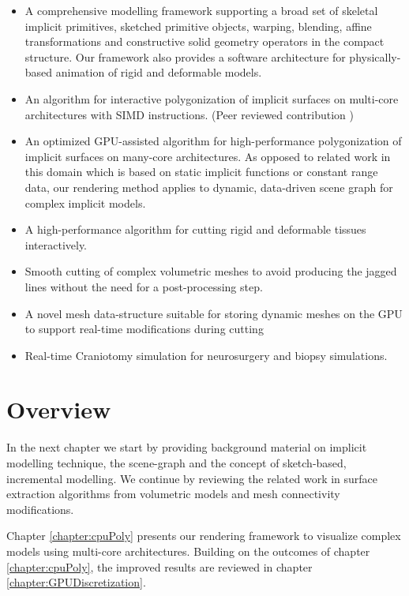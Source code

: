 \begin{itemize}
 \item A comprehensive modelling framework supporting a broad set of skeletal implicit primitives, 
 sketched primitive objects, warping, blending, affine transformations and constructive solid geometry 
 operators in the compact \blob structure. Our framework also provides a software architecture for 
 physically-based animation of rigid and deformable models.
 
 \item An algorithm for interactive polygonization of implicit surfaces on multi-core architectures with 
 SIMD instructions. (Peer reviewed contribution \cite{Shirazian2012}) 
 
 \item An optimized GPU-assisted algorithm for high-performance polygonization of implicit surfaces 
 on many-core architectures. As opposed to related work in this domain which is based on static implicit
 functions or constant range data, our rendering method applies to dynamic, data-driven \blob scene graph
 for complex implicit models. 
  
 \item A high-performance algorithm for cutting rigid and deformable tissues interactively. 
 
 \item Smooth cutting of complex volumetric meshes to avoid producing the jagged lines without the 
 need for a post-processing step.

 \item A novel mesh data-structure suitable for storing dynamic meshes on the GPU to support real-time 
 modifications during cutting
 
\item Real-time Craniotomy simulation for neurosurgery and biopsy simulations.

\end{itemize}


\section{Overview}
In the next chapter we start by providing background material on implicit modelling technique, the 
\blob scene-graph and the concept of sketch-based, incremental modelling.
We continue by reviewing the related work in surface extraction algorithms from volumetric models and
mesh connectivity modifications. 

Chapter \ref{chapter:cpuPoly} presents our rendering framework to visualize complex \blob models using 
multi-core architectures. Building on the outcomes of chapter \ref{chapter:cpuPoly}, the improved results 
are reviewed in chapter \ref{chapter:GPUDiscretization}. 

